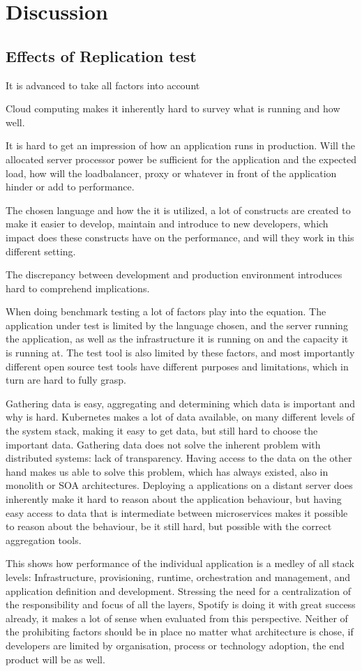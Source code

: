 \chapter{Discussion}
\label{ch:discussion}



\section{Effects of Replication test}
It is advanced to take all factors into account

Cloud computing makes it inherently hard to survey what is running and how well.

It is hard to get an impression of how an application runs in production. Will the allocated server processor power be sufficient for the application and the expected load, how will the loadbalancer, proxy or whatever in front of the application hinder or add to performance.

The chosen language and how the it is utilized, a lot of constructs are created to make it easier to develop, maintain and introduce to new developers, which impact does these constructs have on the performance, and will they work in this different setting.

The discrepancy between development and production environment introduces hard to comprehend implications.

When doing benchmark testing a lot of factors play into the equation. The application under test is limited by the language chosen, and the server running the application, as well as the infrastructure it is running on and the capacity it is running at. The test tool is also limited by these factors, and most importantly different open source test tools have different purposes and limitations, which in turn are hard to fully grasp.

Gathering data is easy, aggregating and determining which data is important and why is hard. Kubernetes makes a lot of data available, on many different levels of the system stack, making it easy to get data, but still hard to choose the important data. Gathering data does not solve the inherent problem with distributed systems: lack of transparency. Having access to the data on the other hand makes us able to solve this problem, which has always existed, also in monolith or SOA architectures. Deploying a applications on a distant server does inherently make it hard to reason about the application behaviour, but having easy access to data that is intermediate between microservices makes it possible to reason about the behaviour, be it still hard, but possible with the correct aggregation tools.

This shows how performance of the individual application is a medley of all stack levels: Infrastructure, provisioning, runtime, orchestration and management, and application definition and development. Stressing the need for a centralization of the responsibility and focus of all the layers, Spotify is doing it with great success already, it makes a lot of sense when evaluated from this perspective. Neither of the prohibiting factors should be in place no matter what architecture is chose, if developers are limited by organisation, process or technology adoption, the end product will be as well.